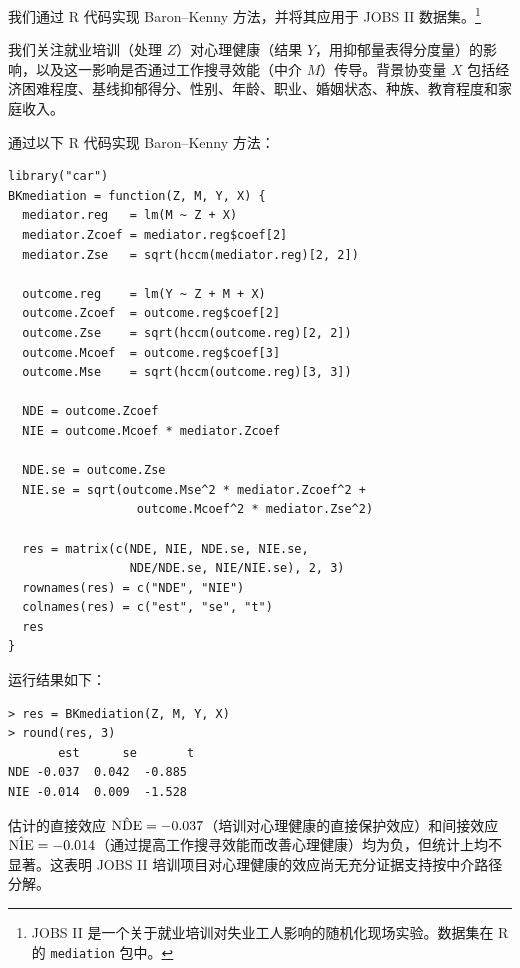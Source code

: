 我们通过 R 代码实现 Baron--Kenny 方法，并将其应用于 JOBS II 数据集。\footnote{JOBS II 是一个关于就业培训对失业工人影响的随机化现场实验。数据集在 R 的 \texttt{mediation} 包中。}

\begin{Example}\label{eg:jobs-mediation}
我们关注就业培训（处理 $Z$）对心理健康（结果 $Y$，用抑郁量表得分度量）的影响，以及这一影响是否通过工作搜寻效能（中介 $M$）传导。背景协变量 $X$ 包括经济困难程度、基线抑郁得分、性别、年龄、职业、婚姻状态、种族、教育程度和家庭收入。

通过以下 R 代码实现 Baron--Kenny 方法：

\begin{verbatim}
library("car")
BKmediation = function(Z, M, Y, X) {
  mediator.reg   = lm(M ~ Z + X)
  mediator.Zcoef = mediator.reg$coef[2]
  mediator.Zse   = sqrt(hccm(mediator.reg)[2, 2])

  outcome.reg    = lm(Y ~ Z + M + X)
  outcome.Zcoef  = outcome.reg$coef[2]
  outcome.Zse    = sqrt(hccm(outcome.reg)[2, 2])
  outcome.Mcoef  = outcome.reg$coef[3]
  outcome.Mse    = sqrt(hccm(outcome.reg)[3, 3])

  NDE = outcome.Zcoef
  NIE = outcome.Mcoef * mediator.Zcoef

  NDE.se = outcome.Zse
  NIE.se = sqrt(outcome.Mse^2 * mediator.Zcoef^2 +
                  outcome.Mcoef^2 * mediator.Zse^2)

  res = matrix(c(NDE, NIE, NDE.se, NIE.se,
                 NDE/NDE.se, NIE/NIE.se), 2, 3)
  rownames(res) = c("NDE", "NIE")
  colnames(res) = c("est", "se", "t")
  res
}
\end{verbatim}

运行结果如下：
\begin{verbatim}
> res = BKmediation(Z, M, Y, X)
> round(res, 3)
       est      se       t
NDE -0.037  0.042  -0.885
NIE -0.014  0.009  -1.528
\end{verbatim}

估计的直接效应 $\hat{\mathrm{NDE}} = -0.037$（培训对心理健康的直接保护效应）和间接效应 $\hat{\mathrm{NIE}} = -0.014$（通过提高工作搜寻效能而改善心理健康）均为负，但统计上均不显著。这表明 JOBS II 培训项目对心理健康的效应尚无充分证据支持按中介路径分解。
\end{Example}

\fboxsep=5pt\fboxrule=1pt
\noindent{}

